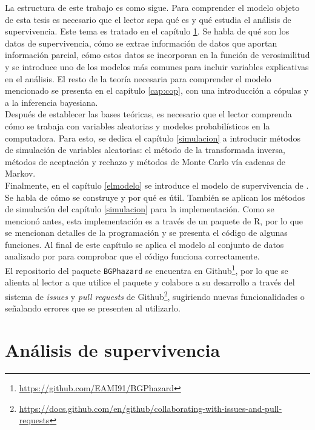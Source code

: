\documentclass[11pt,a4paper]{article}
\begin{document}
La estructura de este trabajo es como sigue. Para comprender el modelo objeto de esta tesis \citep{nieto} es necesario que el lector sepa qué es y qué estudia el análisis de supervivencia. Este tema es tratado en el capítulo \ref{analisis_sup}. Se habla de qué son los datos de supervivencia, cómo se extrae información de datos que aportan información parcial, cómo estos datos se incorporan en la función de verosimilitud y se introduce uno de los modelos más comunes para incluir variables explicativas en el análisis. El resto de la teoría necesaria para comprender el modelo mencionado se presenta en el capítulo \ref{cap:cop}, con una introducción a cópulas y a la inferencia bayesiana.\\

Después de establecer las bases teóricas, es necesario que el lector comprenda cómo se trabaja con variables aleatorias y modelos probabilísticos en la computadora. Para esto, se dedica el capítulo \ref{simulacion} a introducir métodos de simulación de variables aleatorias: el método de la transformada inversa, métodos de aceptación y rechazo y métodos de Monte Carlo vía cadenas de Markov.\\

Finalmente, en el capítulo \ref{elmodelo} se introduce el modelo de supervivencia de \citet{nieto}. Se habla de cómo se construye y por qué es útil. También se aplican los métodos de simulación del capítulo \ref{simulacion} para la implementación. Como se mencionó antes, esta implementación es a través de un paquete de R, por lo que se mencionan detalles de la programación y se presenta el código de algunas funciones. Al final de este capítulo se aplica el modelo al conjunto de datos analizado por \citet{nieto} para comprobar que el código funciona correctamente.\\

El repositorio del paquete \texttt{BGPhazard} \citep{bgphazard} se encuentra en Github\footnote{\url{https://github.com/EAMI91/BGPhazard}}, por lo que se alienta al lector a que utilice el paquete y colabore a su desarrollo a través del sistema de \textit{issues} y \textit{pull requests} de Github\footnote{\url{https://docs.github.com/en/github/collaborating-with-issues-and-pull-requests}}, sugiriendo nuevas funcionalidades  o señalando errores que se presenten al utilizarlo.\\

\newpage

\section{Análisis de supervivencia} \label{analisis_sup}
\end{document}

